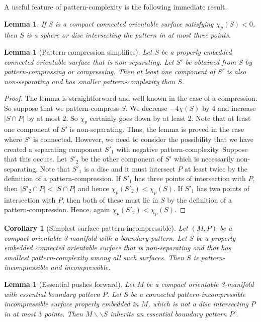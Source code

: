 \documentclass[oneside]{amsart}
\numberwithin{equation}{section}
\theoremstyle{plain}
\newtheorem{corollary}[equation]{Corollary}
\newtheorem{lemma}[equation]{Lemma}
\theoremstyle{definition}
\newcommand{\cut}{\backslash\backslash}
\begin{document}
A useful feature of pattern-complexity is the following immediate result.

\begin{lemma}
If $S$ is a compact connected orientable surface satisfying $\chi_p(S) < 0$, then $S$ is a sphere or disc intersecting the pattern in at most three points.
\end{lemma}

\begin{lemma}[Pattern-compression simplifies]
\label{Lem:CompressionAndPatternComplexity}
Let $S$ be a properly embedded connected orientable surface that is non-separating. Let $S'$ be obtained from $S$ by pattern-compressing or compressing. Then at least one component of $S'$ is also non-separating and has smaller pattern-complexity than $S$.
\end{lemma}

\begin{proof}
The lemma is straightforward and well known in the case of a compression. So suppose that we pattern-compress $S$.
We decrease $-4\chi(S)$ by $4$ and increase $|S \cap P|$ by at most $2$. So $\chi_p$ certainly goes down by at least $2$. Note that at least one component of $S'$ is non-separating. Thus, the lemma is proved in the case where $S'$ is connected. However, we need to consider the possibility that we have  created a separating component $S'_1$ with negative pattern-complexity. Suppose that this occurs. Let $S'_2$ be the other component of $S'$ which is necessarily non-separating. Note that $S'_1$ is a disc and it must intersect $P$ at least twice by the definition of a pattern-compression. If $S'_1$ has three points of intersection with $P$, then $|S'_2 \cap P| < |S \cap P|$ and hence $\chi_p(S'_2) < \chi_p(S)$. If $S'_1$ has two points of intersection with $P$, then both of these must lie in $S$ by the definition of a pattern-compression. Hence, again $\chi_p(S'_2) < \chi_p(S)$.
\end{proof}

\begin{corollary}[Simplest surface pattern-incompressible]
\label{Cor:MinimalComplexityImpliesEssential}
Let $(M,P)$ be a compact orientable 3-manifold with a boundary pattern.
Let $S$ be a properly embedded connected orientable surface that is non-separating and that has smallest pattern-complexity among all such surfaces. Then $S$ is pattern-incompressible and incompressible.
\end{corollary}

\begin{lemma}[Essential pushes forward]
\label{Lem:EssentialPushesForward}
Let $M$ be a compact orientable 3-manifold with essential boundary pattern $P$. Let $S$ be a connected pattern-incompressible incompressible surface properly embedded in $M$, which is not a disc intersecting $P$ in at most $3$ points. Then $M \cut S$ inherits an essential boundary pattern $P'$.
\end{lemma}
\end{document}
